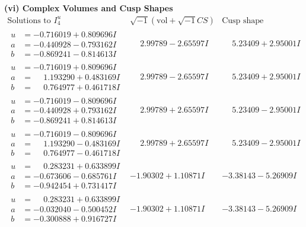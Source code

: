 \documentclass[1p]{elsarticle_modified}
\theoremstyle{definition}
\newcommand{\I}{\sqrt{-1}}
\begin{document}
\newpage\flushleft \textbf{(vi) Complex Volumes and Cusp Shapes}
$$\begin{array}{c|c|c}  
\text{Solutions to }I^u_{4}& \I (\text{vol} + \sqrt{-1}CS) & \text{Cusp shape}\\
 \hline 
\begin{aligned}
u &= -0.716019 + 0.809696 I \\
a &= -0.440928 - 0.793162 I \\
b &= -0.869241 - 0.814613 I\end{aligned}
 & \phantom{-}2.99789 - 2.65597 I & \phantom{-}5.23409 + 2.95001 I \\ \hline\begin{aligned}
u &= -0.716019 + 0.809696 I \\
a &= \phantom{-}1.193290 + 0.483169 I \\
b &= \phantom{-}0.764977 + 0.461718 I\end{aligned}
 & \phantom{-}2.99789 - 2.65597 I & \phantom{-}5.23409 + 2.95001 I \\ \hline\begin{aligned}
u &= -0.716019 - 0.809696 I \\
a &= -0.440928 + 0.793162 I \\
b &= -0.869241 + 0.814613 I\end{aligned}
 & \phantom{-}2.99789 + 2.65597 I & \phantom{-}5.23409 - 2.95001 I \\ \hline\begin{aligned}
u &= -0.716019 - 0.809696 I \\
a &= \phantom{-}1.193290 - 0.483169 I \\
b &= \phantom{-}0.764977 - 0.461718 I\end{aligned}
 & \phantom{-}2.99789 + 2.65597 I & \phantom{-}5.23409 - 2.95001 I \\ \hline\begin{aligned}
u &= \phantom{-}0.283231 + 0.633899 I \\
a &= -0.673606 - 0.685761 I \\
b &= -0.942454 + 0.731417 I\end{aligned}
 & -1.90302 + 1.10871 I & -3.38143 - 5.26909 I \\ \hline\begin{aligned}
u &= \phantom{-}0.283231 + 0.633899 I \\
a &= -0.032040 - 0.500452 I \\
b &= -0.300888 + 0.916727 I\end{aligned}
 & -1.90302 + 1.10871 I & -3.38143 - 5.26909 I \\ \hline\begin{aligned}

\end{aligned}
\end{array}$$
\end{document}
